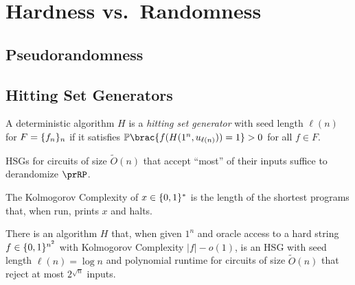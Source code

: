 \chapter{Hardness vs.\ Randomness}
\label{lec:02}

\section{Pseudorandomness}

\section{Hitting Set Generators}

\begin{definition}
    A deterministic algorithm $H$ is a \emph{hitting set generator} with seed length $\ell(n)$ for $F = \{f_n\}_n$ if
    it satisfies $\Pr\brac{f(H(1^n, u_{\ell(n)})) = 1} > 0$ for all $f \in F$.
\end{definition}

\begin{theorem}
    HSGs for circuits of size $\widetilde{O}(n)$ that accept ``most'' of their inputs 
    suffice to derandomize $\prRP$.
\end{theorem}


\begin{definition}
    The Kolmogorov Complexity of $x \in \{0, 1\}^*$ is the length of the shortest 
    programs that, when run, prints $x$ and halts.
\end{definition}

\begin{theorem}
    There is an algorithm $H$ that, when given $1^n$ and oracle access to a hard 
    string $f \in \{0, 1\}^{n^2}$ with Kolmogorov Complexity $|f| - o(1)$, is 
    an HSG with seed length $\ell(n) = \log{n}$ and polynomial runtime for circuits 
    of size $\widetilde{O}(n)$ that reject at most $2^{\sqrt{n}}$ inputs.
\end{theorem}

